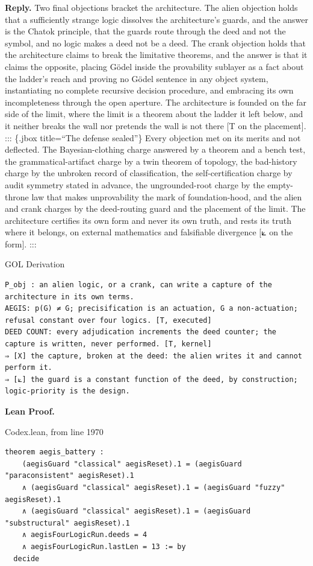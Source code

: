 \documentclass[10pt,twocolumn]{article}
\begin{document}
\textbf{Reply.} Two final objections bracket the architecture. The alien
objection holds that a sufficiently strange logic dissolves the
architecture's guards, and the answer is the Chatok principle, that the
guards route through the deed and not the symbol, and no logic makes a
deed not be a deed. The crank objection holds that the architecture
claims to break the limitative theorems, and the answer is that it
claims the opposite, placing Gödel inside the provability sublayer as a
fact about the ladder's reach and proving no Gödel sentence in any
object system, instantiating no complete recursive decision procedure,
and embracing its own incompleteness through the open aperture. The
architecture is founded on the far side of the limit, where the limit is
a theorem about the ladder it left below, and it neither breaks the wall
nor pretends the wall is not there {[}T on the placement{]}. ::: \{.jbox
title=``The defense sealed''\} Every objection met on its merits and not
deflected. The Bayesian-clothing charge answered by a theorem and a
bench test, the grammatical-artifact charge by a twin theorem of
topology, the bad-history charge by the unbroken record of
classification, the self-certification charge by audit symmetry stated
in advance, the ungrounded-root charge by the empty-throne law that
makes unprovability the mark of foundation-hood, and the alien and crank
charges by the deed-routing guard and the placement of the limit. The
architecture certifies its own form and never its own truth, and rests
its truth where it belongs, on external mathematics and falsifiable
divergence {[}⟀ on the form{]}. :::

\begin{golbox}{GOL Derivation}
\begin{lstlisting}[style=golv]
P_obj : an alien logic, or a crank, can write a capture of the architecture in its own terms.
AEGIS: p(G) ≠ G; precisification is an actuation, G a non-actuation; refusal constant over four logics. [T, executed]
DEED COUNT: every adjudication increments the deed counter; the capture is written, never performed. [T, kernel]
⇒ [X] the capture, broken at the deed: the alien writes it and cannot perform it.
⇒ [⟀] the guard is a constant function of the deed, by construction; logic-priority is the design.
\end{lstlisting}
\end{golbox}

\textbf{Lean Proof.}

\begin{leanexcerpt}{Codex.lean, from line 1970}
\begin{lstlisting}[style=leanx,firstnumber=1970]
theorem aegis_battery :
    (aegisGuard "classical" aegisReset).1 = (aegisGuard "paraconsistent" aegisReset).1
    ∧ (aegisGuard "classical" aegisReset).1 = (aegisGuard "fuzzy" aegisReset).1
    ∧ (aegisGuard "classical" aegisReset).1 = (aegisGuard "substructural" aegisReset).1
    ∧ aegisFourLogicRun.deeds = 4
    ∧ aegisFourLogicRun.lastLen = 13 := by
  decide
\end{lstlisting}
\end{leanexcerpt}
\end{document}

